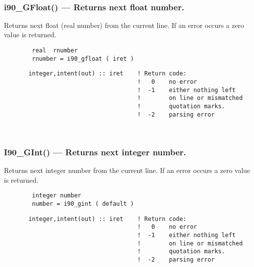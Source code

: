  
\mbox{}\hrulefill\ 
 
  \subsubsection{i90\_GFloat() --- Returns next float number. }

    Returns next float (real number) from the current line.
    If an error occurs a zero value is returned.
  
\begin{verbatim}        real  rnumber
        rnumber = i90_gfloat ( iret )\end{verbatim}
\begin{verbatim}       integer,intent(out) :: iret    ! Return code:
                                      !   0    no error
                                      !  -1    either nothing left
                                      !        on line or mismatched
                                      !        quotation marks.
                                      !  -2    parsing error
 \end{verbatim}%
 
 
\mbox{}\hrulefill\ 
 

  \subsubsection{I90\_GInt() --- Returns next integer number. }

    Returns next integer number from the current line.
    If an error occurs a zero value is returned.
  
\begin{verbatim}        integer number
        number = i90_gint ( default )\end{verbatim}
\begin{verbatim}
       integer,intent(out) :: iret    ! Return code:
                                      !   0    no error
                                      !  -1    either nothing left
                                      !        on line or mismatched
                                      !        quotation marks.
                                      !  -2    parsing error
 \end{verbatim}%
 
